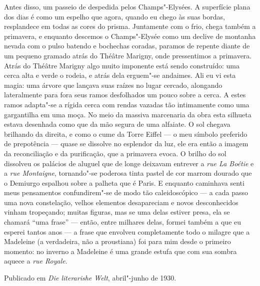 Antes disso, um passeio de despedida pelos Champs"-Elysées. A superfície
plana dos dias é como um espelho que agora, quando eu chego às suas
bordas, resplandece em todas as cores do prisma. Juntamente com o frio,
chega também a primavera, e enquanto descemos o Champs"-Elysée como um
declive de montanha nevada com o pulso batendo e bochechas coradas,
paramos de repente diante de um pequeno gramado atrás do Théâtre
Marigny, onde pressentimos a primavera. Atrás do Théâtre Marigny algo
muito imponente está sendo construído: uma cerca alta e verde o rodeia,
e atrás dela erguem"-se andaimes. Ali eu vi esta magia: uma árvore que
lançava suas raízes no lugar cercado, alongando lateralmente para fora
seus ramos desfolhados um pouco sobre a cerca. A estes ramos adapta"-se a
rígida cerca com rendas vazadas tão intimamente como uma gargantilha em
uma moça. No meio da massiva marcenaria da obra esta silhueta estava
desenhada como que da mão segura de uma alfaiate. O sol chegava
brilhando da direita, e como o cume da Torre Eiffel --- o meu símbolo
preferido de prepotência --- quase se dissolve no esplendor da luz, ele
era então a imagem da reconciliação e da purificação, que a primavera
evoca. O brilho do sol dissolveu os palácios de aluguel que de longe
deixavam entrever a \emph{rue La Boétie} e a \emph{rue Montaigne},
tornando"-se poderosa tinta pastel de cor marrom dourado que o Demiurgo
espalhou sobre a palheta que é Paris. E enquanto caminhava senti meus
pensamentos confundirem"-se de modo tão caleidoscópico --- a cada passo
uma nova constelação, velhos elementos desapareciam e novos
desconhecidos vinham tropeçando; muitas figuras, mas se uma delas
estiver presa, ela se chamará ``uma frase'' --- então, entre milhares
delas, formei também a que eu esperei tantos anos --- a frase que
envolveu completamente todo o milagre que a Madeleine (a verdadeira, não
a proustiana) foi para mim desde o primeiro momento: no inverno a
Madeleine é uma grande estufa que com sua sombra aquece a \emph{rue
Royale}.

Publicado em \emph{Die literarishe Welt}, abril"-junho de 1930.
